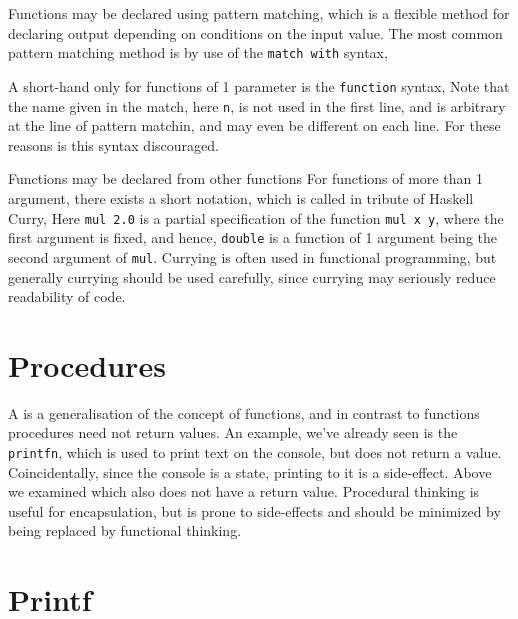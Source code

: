 Functions may be declared using pattern matching, which is a flexible method for declaring output depending on conditions on the input value. The most common pattern matching method is by use of the \texttt{match with} syntax,

A short-hand only for functions of 1 parameter is the \texttt{function} syntax,
Note that the name given in the match, here \texttt{n}, is not used in the first line, and is arbitrary at the line of pattern matchin, and may even be different on each line. For these reasons is this syntax discouraged.

Functions may be declared from other functions
For functions of more than 1 argument, there exists a short notation, which is called  in tribute of Haskell Curry,
Here \texttt{mul 2.0} is a partial specification of the function \texttt{mul x y}, where the first argument is fixed, and hence, \texttt{double} is a function of 1 argument being the second argument of \texttt{mul}. Currying is often used in functional programming, but generally currying should be used carefully, since currying may seriously reduce readability of code.

\section{Procedures}
A  is a generalisation of the concept of functions, and in contrast to functions procedures need not return values. An example, we've already seen is the \texttt{printfn}, which is used to print text on the console, but does not return a value. Coincidentally, since the console is a state, printing to it is a side-effect. Above we examined 
which also does not have a return value. Procedural thinking is useful for encapsulation, but is prone to side-effects and should be minimized by being replaced by functional thinking.

\section{Printf}
\label{sec:printf}
